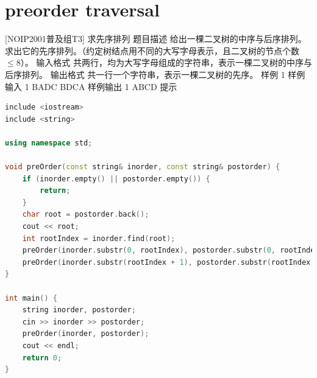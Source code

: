 \documentclass[12pt,twiside,a4paper]{ctexbook}
\numberwithin{chapter}{part}
\begin{document}
\section{preorder traversal}
[NOIP2001普及组T3] 求先序排列
 题目描述
给出一棵二叉树的中序与后序排列。求出它的先序排列。（约定树结点用不同的大写字母表示，且二叉树的节点个数 $ \le 8$）。
 输入格式
共两行，均为大写字母组成的字符串，表示一棵二叉树的中序与后序排列。
 输出格式
共一行一个字符串，表示一棵二叉树的先序。
 样例 1
 样例输入 1
BADC
BDCA
样例输出 1
ABCD
 提示
\begin{lstlisting}[language=C++,breaklines=true]
include <iostream>
include <string>

using namespace std;

void preOrder(const string& inorder, const string& postorder) {
    if (inorder.empty() || postorder.empty()) {
        return;
    }
    char root = postorder.back();
    cout << root;
    int rootIndex = inorder.find(root);
    preOrder(inorder.substr(0, rootIndex), postorder.substr(0, rootIndex));
    preOrder(inorder.substr(rootIndex + 1), postorder.substr(rootIndex, postorder.length() - rootIndex - 1));
}

int main() {
    string inorder, postorder;
    cin >> inorder >> postorder;
    preOrder(inorder, postorder);
    cout << endl;
    return 0;
}
\end{lstlisting}
\end{document}
